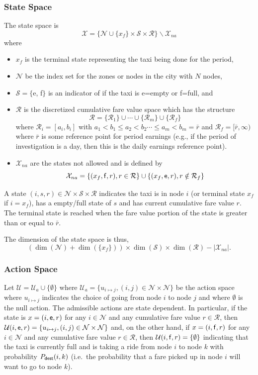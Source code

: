 \documentclass{article}
\newcommand{\mc}{\mathcal}
\newcommand{\sn}[1]{{\sf{#1}}}
\newcommand{\e}{{\sf e}}
\newcommand{\f}{{\sf f}}
\newcommand{\Pdest}{P_{\text{\sn{dest}}}}
\begin{document}
\subsubsection{State Space}
The state space is
\[\mc{X}=\{\mc{N}\cup\{x_f\}\times\mc{S}\times \mc{R}\}\backslash \mc{X}_{na}\]
where
\begin{itemize}
\item $x_f$ is the terminal state representing the taxi being done for the period,

\item $\mc{N}$ be the index set for the zones or nodes in the city with $N$ nodes,

\item $\mc{S}=\{${\e, \f}$\}$ is an indicator of if the taxi is \e=empty or \f=full, and

\item $\mc{R}$ is the discretized cumulative fare value space which has the
structure \[\mc{R}=\{\mc{R}_1\}\cup\cdots\cup\{\mc{R}_m\}\cup\{\mc{R}_f\}\]
where $\mc{R}_i=[a_i,b_i]$ with $a_1< b_1\leq a_2<b_2 \cdots \leq a_m<
b_m=\bar{r}$ and $\mc{R}_f=[\bar{r}, \infty)$ where $\bar{r}$ is some reference point for period earnings (e.g., if the period of investigation is a day, then this is the daily earnings reference point).

\item $\mc{X}_{na}$ are the states not allowed and is defined by
\[\mc{X}_{na}=\{(x_f,\f,r), r\in \mc{R}\}\cup\{(x_f,\e,r), r\notin\mc{R}_f\}\]
\end{itemize}
   
A state $(i,s,r)\in \mc{N}\times\mc{S}\times \mc{R}$ indicates the taxi
is in node $i$ (or terminal state $x_f$ if $i=x_f$), has a empty/full state of $s$ and has current cumulative
fare value $r$. The terminal state is reached when the fare value portion of the
state is greater than or equal to $\bar{r}$. 

The dimension of the state space is thus, 
\[(\dim(\mc{N})+\dim(\{x_f\}))\times\dim(\mc{S})\times\dim(\mc{R})-|\mc{X}_{na}|.\]


\subsubsection{Action Space}
Let $\mc{U}=\mc{U}_a\cup\{\emptyset\}$ where
$\mc{U}_a=\{u_{i\mapsto j}, (i,j)\in \mc{N}\times \mc{N}\}$ be the action space where $u_{i\mapsto j}$ indicates the choice of going from node $i$ to node $j$ and where $\emptyset$ is the null action. The admissible actions are state dependent. In particular, if the state is $x=(i,\e,r)$ for any $i\in
\mc{N}$ and any cumulative fare value $r\in\mc{R}$, then $\mc{U}(i,\e,r)=\{u_{i\mapsto j}, (i,j)\in \mc{N}\times \mc{N}\}$ and, on the other hand, if $x=(i,\f,r)$ for any $i\in \mc{N}$ and any cumulative fare value $r\in\mc{R}$, then
$\mc{U}(i,\f,r)=\{\emptyset\}$ indicating that the taxi is currently full and is taking a ride from node $i$ to node $k$ with probability $\Pdest(i,k)$ (i.e.~the probability that a fare picked up in node $i$ will want to go to node $k$).
\end{document}
